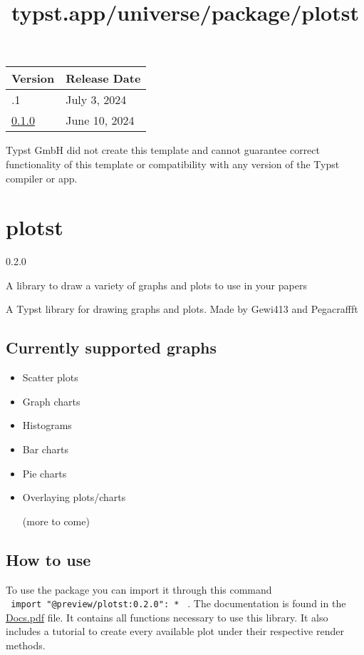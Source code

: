 \begin{longtable}[]{@{}ll@{}}
\toprule\noalign{}
Version & Release Date \\
\midrule\noalign{}
\endhead
\bottomrule\noalign{}
\endlastfoot
0.1.1 & July 3, 2024 \\
\href{https://typst.app/universe/package/soviet-matrix/0.1.0/}{0.1.0} &
June 10, 2024 \\
\end{longtable}

Typst GmbH did not create this template and cannot guarantee correct
functionality of this template or compatibility with any version of the
Typst compiler or app.


\title{typst.app/universe/package/plotst}

\label{banner}
\section{plotst}\label{plotst}

{ 0.2.0 }

A library to draw a variety of graphs and plots to use in your papers

\label{readme}
A Typst library for drawing graphs and plots. Made by Gewi413 and
Pegacraffft

\subsection{Currently supported
graphs}\label{currently-supported-graphs}

\begin{itemize}
\item
  Scatter plots
\item
  Graph charts
\item
  Histograms
\item
  Bar charts
\item
  Pie charts
\item
  Overlaying plots/charts

  (more to come)
\end{itemize}

\subsection{How to use}\label{how-to-use}

To use the package you can import it through this command
\texttt{\ import\ "@preview/plotst:0.2.0":\ *\ } . The documentation is
found in the
\href{https://github.com/Pegacraft/typst-plotting/blob/8d834689359b708ce75fe51be05eed45570e463e/docs/Docs.pdf}{Docs.pdf}
file. It contains all functions necessary to use this library. It also
includes a tutorial to create every available plot under their
respective render methods.

